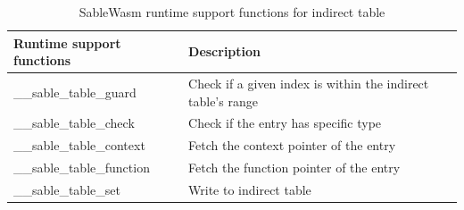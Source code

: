 \begin{table}[h]
    \begin{tabular}{|l|l|}
        \hline
        \textbf{Runtime support functions} & \textbf{Description}                                        \\ \hline
        \_\_sable\_table\_guard            & Check if a given index is within the indirect table's range \\ \hline
        \_\_sable\_table\_check            & Check if the entry has specific type                        \\ \hline
        \_\_sable\_table\_context          & Fetch the context pointer of the entry                      \\ \hline
        \_\_sable\_table\_function         & Fetch the function pointer of the entry                     \\ \hline
        \_\_sable\_table\_set              & Write to indirect table                                     \\ \hline
    \end{tabular}
    \caption{SableWasm runtime support functions for indirect table}
    \label{tbl:sablewasm-runtime-table-api}
\end{table}

